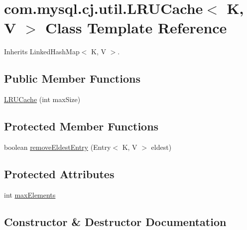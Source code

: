 \hypertarget{classcom_1_1mysql_1_1cj_1_1util_1_1_l_r_u_cache}{}\section{com.\+mysql.\+cj.\+util.\+L\+R\+U\+Cache$<$ K, V $>$ Class Template Reference}
\label{classcom_1_1mysql_1_1cj_1_1util_1_1_l_r_u_cache}


Inherits Linked\+Hash\+Map$<$ K, V $>$.

\subsection*{Public Member Functions}
\begin{DoxyCompactItemize}
\item 
\mbox{\hyperlink{classcom_1_1mysql_1_1cj_1_1util_1_1_l_r_u_cache_a5ecb8fc6166af1e20a5e67f8505f5702}{L\+R\+U\+Cache}} (int max\+Size)
\end{DoxyCompactItemize}
\subsection*{Protected Member Functions}
\begin{DoxyCompactItemize}
\item 
boolean \mbox{\hyperlink{classcom_1_1mysql_1_1cj_1_1util_1_1_l_r_u_cache_a661aa5aa8a43ec36c8bbb23f224ed392}{remove\+Eldest\+Entry}} (Entry$<$ K, V $>$ eldest)
\end{DoxyCompactItemize}
\subsection*{Protected Attributes}
\begin{DoxyCompactItemize}
\item 
int \mbox{\hyperlink{classcom_1_1mysql_1_1cj_1_1util_1_1_l_r_u_cache_a6e6ca813624fbaffd4f734b48e10e7e9}{max\+Elements}}
\end{DoxyCompactItemize}


\subsection{Constructor \& Destructor Documentation}
\mbox{\label{classcom_1_1mysql_1_1cj_1_1util_1_1_l_r_u_cache_a5ecb8fc6166af1e20a5e67f8505f5702}} 
